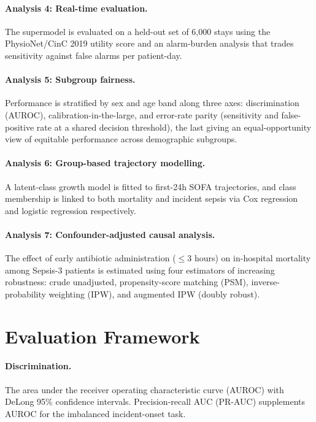 \paragraph{Analysis 4: Real-time evaluation.}
The supermodel is evaluated on a held-out set of 6{,}000 stays using the
PhysioNet/CinC 2019 utility score and an alarm-burden analysis that trades
sensitivity against false alarms per patient-day.

\paragraph{Analysis 5: Subgroup fairness.}
Performance is stratified by sex and age band along three axes: discrimination
(AUROC), calibration-in-the-large, and error-rate parity (sensitivity and
false-positive rate at a shared decision threshold), the last giving an
equal-opportunity view of equitable performance across demographic subgroups.

\paragraph{Analysis 6: Group-based trajectory modelling.}
A latent-class growth model is fitted to first-24h SOFA trajectories, and
class membership is linked to both mortality and incident sepsis via Cox
regression and logistic regression respectively.

\paragraph{Analysis 7: Confounder-adjusted causal analysis.}
The effect of early antibiotic administration ($\le 3$ hours) on in-hospital
mortality among Sepsis-3 patients is estimated using four estimators of
increasing robustness: crude unadjusted, propensity-score matching (PSM),
inverse-probability weighting (IPW), and augmented IPW (doubly robust).

\section{Evaluation Framework}
\label{sec:eval_framework}

\paragraph{Discrimination.} The area under the receiver operating
characteristic curve (AUROC) with DeLong 95\% confidence intervals.
Precision-recall AUC (PR-AUC) supplements AUROC for the imbalanced
incident-onset task.

